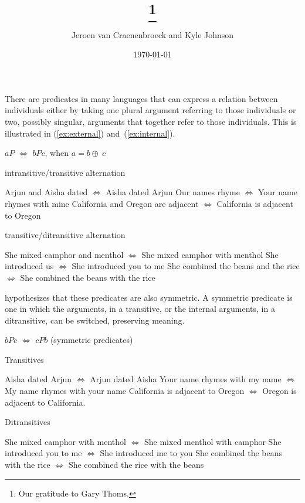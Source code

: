 \documentclass[twoside, 12pt]{article}
\title{\paper\thanks{Our gratitude to Gary Thoms.}}
\author{Jeroen van Craenenbroeck and Kyle Johnson}
\date{\today}
\begin{document}
\begin{titlepage} 
\maketitle 
\thispagestyle{empty}
\begin{abstract}

 \noindent 
 
 \end{abstract}
 \end{titlepage} 

\thispagestyle{empty}
\noindent
There are predicates in many languages that can express a relation between individuals either by taking one plural argument referring to those individuals or two, possibly singular, arguments that together refer to those individuals. This is illustrated in (\ref{ex:external}) and~(\ref{ex:internal}).
\begin{exe}
\raggedright
\ex \label{ex:plainsymm} $aP$ $\Leftrightarrow$ $bPc$, when $a = b \oplus\ c$
\begin{xlist}
  \ex \label{ex:external} intransitive/transitive alternation
  \begin{xlist}
    \ex Arjun and Aisha dated $\Leftrightarrow$ Aisha dated Arjun
    \ex Our names rhyme $\Leftrightarrow$ Your name rhymes with mine
    \ex California and Oregon are adjacent $\Leftrightarrow$ California is adjacent to Oregon
  \end{xlist}
  \ex \label{ex:internal} transitive/ditransitive alternation
  \begin{xlist}
    \ex She mixed camphor and menthol $\Leftrightarrow$ She mixed camphor with menthol
    \ex She introduced us $\Leftrightarrow$ She introduced you to me
    \ex She combined the beans and the rice $\Leftrightarrow$ She combined the beans with the rice
  \end{xlist}
\end{xlist}
\end{exe}
\citet{Winter:2018} hypothesizes that these predicates are also symmetric. A symmetric predicate is one in which the arguments, in a transitive, or the internal arguments, in a ditransitive, can be switched, preserving meaning.
\begin{exe}
\raggedright
  \ex \label{ex:symm} $bPc$ $\Leftrightarrow$ $cPb$ (symmetric predicates)
  \begin{xlist}
  \ex \label{ex:symmtrans} Transitives
  \begin{xlist}
    \ex Aisha dated Arjun $\Leftrightarrow$ Arjun dated Aisha
    \ex Your name rhymes with my name $\Leftrightarrow$ My name rhymes with your name
    \ex California is adjacent to Oregon $\Leftrightarrow$ Oregon is adjacent to California.
  \end{xlist}
  \ex Ditransitives
  \begin{xlist}
    \ex She mixed camphor with menthol $\Leftrightarrow$ She mixed menthol with camphor 
    \ex She introduced you to me $\Leftrightarrow$ She introduced me to you
    \ex She combined the beans with the rice $\Leftrightarrow$ She combined the rice with the beans
  \end{xlist}
\end{xlist}
\end{exe}
\end{document}

